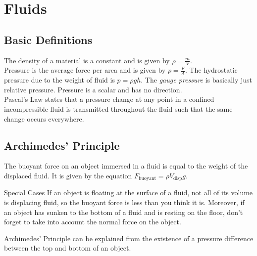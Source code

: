 \documentclass[class=article, crop=false]{standalone}
\begin{document}
  \section{Fluids}
  \subsection{Basic Definitions}
  The density of a material is a constant and is given by $\rho = \frac{m}{V}$. \\[10pt]
  Pressure is the average force per area and is given by $p=\frac{F}{A}$. The hydrostatic pressure due to the weight of fluid is $p=\rho gh$. The \emph{gauge pressure} is basically just relative pressure. Pressure is a scalar and has no direction. \\[10pt]
  Pascal's Law states that a pressure change at any point in a confined incompressible fluid is transmitted throughout the fluid such that the same change occurs everywhere.
  \subsection{Archimedes' Principle}
  The buoyant force on an object immersed in a fluid is equal to the weight of the displaced fluid. It is given by the equation $F_{\text{buoyant}} = \rho V_{\text{disp}}g$.
  \begin{note}{Special Cases}
    If an object is floating at the surface of a fluid, not all of its volume is displacing fluid, so the buoyant force is less than you think it is. Moreover, if an object has sunken to the bottom of a fluid and is resting on the floor, don't forget to take into account the normal force on the object.
  \end{note}
  Archimedes' Principle can be explained from the existence of a pressure difference between the top and bottom of an object.
\end{document}
